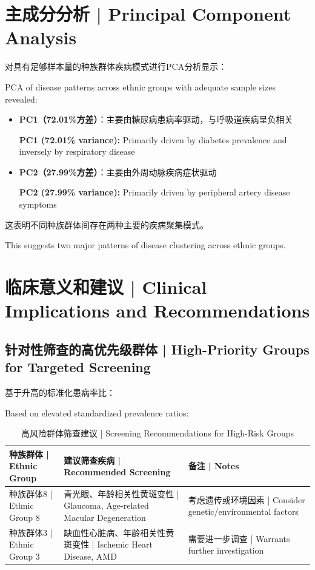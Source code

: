\documentclass[12pt,a4paper]{article}
\begin{document}
\section{主成分分析 | Principal Component Analysis}

对具有足够样本量的种族群体疾病模式进行PCA分析显示：

PCA of disease patterns across ethnic groups with adequate sample sizes revealed:

\begin{itemize}
    \item \textbf{PC1（72.01\%方差）}：主要由糖尿病患病率驱动，与呼吸道疾病呈负相关
    
    \textbf{PC1 (72.01\% variance):} Primarily driven by diabetes prevalence and inversely by respiratory disease
    
    \item \textbf{PC2（27.99\%方差）}：主要由外周动脉疾病症状驱动
    
    \textbf{PC2 (27.99\% variance):} Primarily driven by peripheral artery disease symptoms
\end{itemize}

这表明不同种族群体间存在两种主要的疾病聚集模式。

This suggests two major patterns of disease clustering across ethnic groups.

\section{临床意义和建议 | Clinical Implications and Recommendations}

\subsection{针对性筛查的高优先级群体 | High-Priority Groups for Targeted Screening}

基于升高的标准化患病率比：

Based on elevated standardized prevalence ratios:

\begin{table}[H]
\centering
\caption{高风险群体筛查建议 | Screening Recommendations for High-Risk Groups}
\begin{tabular}{@{}p{4cm}p{6cm}p{4cm}@{}}
\toprule
\textbf{种族群体 | Ethnic Group} & \textbf{建议筛查疾病 | Recommended Screening} & \textbf{备注 | Notes} \\
\midrule
种族群体8 | Ethnic Group 8 & 青光眼、年龄相关性黄斑变性 | Glaucoma, Age-related Macular Degeneration & 考虑遗传或环境因素 | Consider genetic/environmental factors \\
\midrule
种族群体3 | Ethnic Group 3 & 缺血性心脏病、年龄相关性黄斑变性 | Ischemic Heart Disease, AMD & 需要进一步调查 | Warrants further investigation \\
\bottomrule
\end{tabular}
\end{table}
\end{document}
